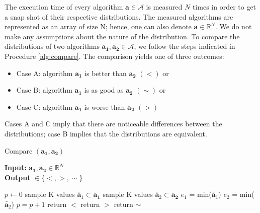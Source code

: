 \documentclass[conference]{IEEEtran}
\newcommand{\p}[1]{{\color{blue} Pdj: #1}}
\begin{document}
The execution time of every algorithm $\mathbf{a} \in \mathcal{A}$ is measured $N$ times in order to get a snap shot of their respective distributions. The measured algorithms are represented as an array of size N; hence, one can also denote $\mathbf{a} \in \mathbb{R}^N$.  We do not make any assumptions about the nature of the distribution. To compare the distributions of two algorithms $\mathbf{a_1},\mathbf{a_2} \in \mathcal{A}$, we follow the steps indicated in Procedure \ref{alg:compare}. 
%
The comparison yields one of three outcomes:
\begin{itemize}
	\item Case A: algorithm $\mathbf{a_1}$ is better than $\mathbf{a_2}$ $(<)$ or
	\item Case B: algorithm  $\mathbf{a_1}$ is as good as $\mathbf{a_2}$ $(\sim)$ or
	\item Case C: algorithm  $\mathbf{a_1}$ is worse than $\mathbf{a_2}$ $(>)$ 
\end{itemize}
Cases A and C imply that there are noticeable differences between the distributions; case B implies that the distributions are equivalent.
\begin{algorithm}
	\caption{Compare $(\mathbf{a_1}, \mathbf{a_2})$ }
	\label{alg:compare}
	\hspace*{\algorithmicindent} \textbf{Input: } $ \mathbf{a_1}, \mathbf{a_2} \in \mathbb{R}^{N}$ \\
	\hspace*{\algorithmicindent} \textbf{Output } $\in  \{<,>,\sim \}$
	\begin{algorithmic}[1] 
		\State $p \leftarrow 0$
		\State sample K values $\tilde{\mathbf{a}_1} \subset \mathbf{a_1}$
		\State sample K values $\tilde{\mathbf{a}_2} \subset \mathbf{a_2}$
		\State $e_1$ = min($\tilde{\mathbf{a}_1}$)
		\State $e_2$ = min($\tilde{\mathbf{a}_2}$)
		\State $p=p+1$
		\EndIf
		\EndFor
		\State return $<$ 
		\State return $>$ 
		\Else
		\State return $\sim$ 
		\EndIf
	\end{algorithmic}
\end{algorithm}
\end{document}

